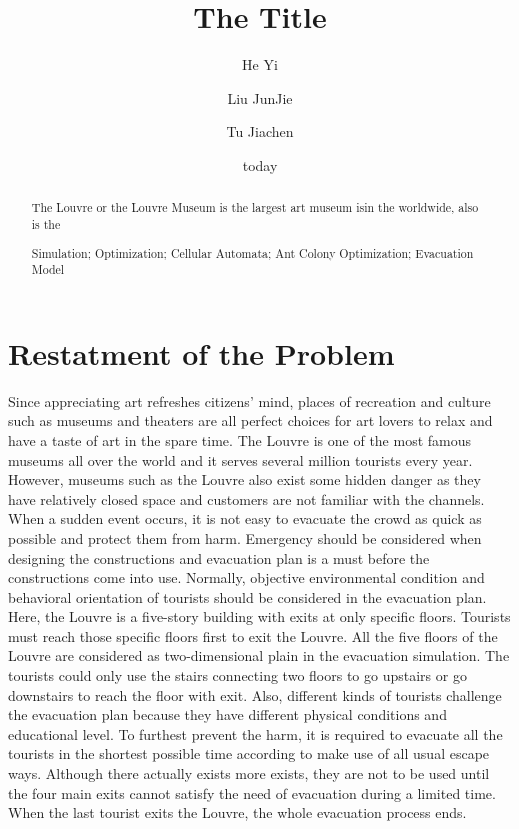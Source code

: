 \documentclass{mcmthesis}
\title{The Title}
\author{He Yi \and Liu JunJie \and Tu Jiachen}
\date{today}
\begin{document}
\begin{abstract}
The Louvre or the Louvre Museum is the  largest art museum isin the worldwide, also is the             %
\begin{keywords}
Simulation; Optimization; Cellular Automata; Ant Colony Optimization; Evacuation Model
\end{keywords}
\end{abstract}

\maketitle                  %

\tableofcontents %

\newpage

\section{Restatment of the Problem}
Since appreciating art refreshes citizens’ mind, places of recreation and culture such as museums and theaters are all perfect choices for art lovers to relax and have a taste of art in the spare time. The Louvre is one of the most famous museums all over the world and it serves several million tourists every year. However, museums such as the Louvre also exist some hidden danger as they have relatively closed space and customers are not familiar with the channels. When a sudden event occurs, it is not easy to evacuate the crowd as quick as possible and protect them from harm. Emergency should be considered when designing the constructions and evacuation plan is a must before the constructions come into use.
Normally, objective environmental condition and behavioral orientation of tourists should be considered in the evacuation plan.
Here, the Louvre is a five-story building with exits at only specific floors. Tourists must reach those specific floors first to exit the Louvre. All the five floors of the Louvre are considered as two-dimensional plain in the evacuation simulation. The tourists could only use the stairs connecting two floors to go upstairs or go downstairs to reach the floor with exit. Also, different kinds of tourists challenge the evacuation plan because they have different physical conditions and educational level. To furthest prevent the harm, it is required to evacuate all the tourists in the shortest possible time according to make use of all usual escape ways. Although there actually exists more exists, they are not to be used until the four main exits cannot satisfy the need of evacuation during a limited time. When the last tourist exits the Louvre, the whole evacuation process ends.
\end{document}
